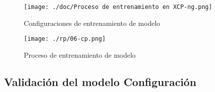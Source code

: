 \begin{figure}[H]
   \centering %
       \texttt{[image: ./doc/Proceso de entrenamiento en XCP-ng.png]} 
   \caption{Configuraciones de entrenamiento de modelo  \cite{}}
  \label{figure:Configuraciones modelo entrenamiento 2}  %
\end{figure}
\begin{figure}[H]
   \centering %
       \texttt{[image: ./rp/06-cp.png]} 
   \caption{Proceso de entrenamiento de modelo\cite{}}
  \label{figure:Proceso de entrenamiento del modelo}  %
\end{figure}
\clearpage

\subsection{Validación del modelo Configuración}\label{section:Validación de prompt}
